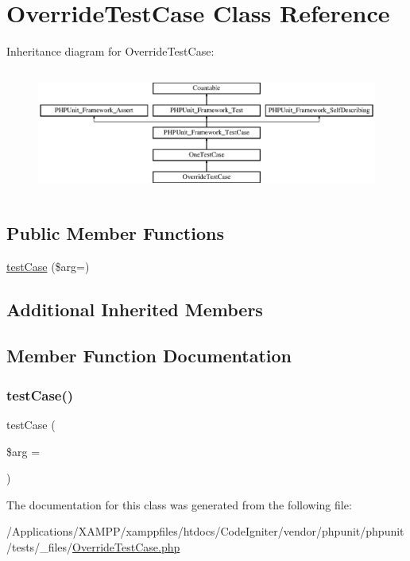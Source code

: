 \hypertarget{class_override_test_case}{}\section{Override\+Test\+Case Class Reference}
\label{class_override_test_case}
Inheritance diagram for Override\+Test\+Case\+:\begin{figure}[H]
\begin{center}
\leavevmode
\includegraphics[height=4.129793cm]{class_override_test_case}
\end{center}
\end{figure}
\subsection*{Public Member Functions}
\begin{DoxyCompactItemize}
\item 
\mbox{\hyperlink{class_override_test_case_ad285be88191f34024fb8653fe642fdc2}{test\+Case}} (\$arg=\textquotesingle{}\textquotesingle{})
\end{DoxyCompactItemize}
\subsection*{Additional Inherited Members}


\subsection{Member Function Documentation}
\mbox{\label{class_override_test_case_ad285be88191f34024fb8653fe642fdc2}} 
\subsubsection{\texorpdfstring{test\+Case()}{testCase()}}
{\footnotesize\ttfamily test\+Case (\begin{DoxyParamCaption}\item[{}]{\$arg = {\ttfamily \textquotesingle{}\textquotesingle{}} }\end{DoxyParamCaption})}



The documentation for this class was generated from the following file\+:\begin{DoxyCompactItemize}
\item 
/\+Applications/\+X\+A\+M\+P\+P/xamppfiles/htdocs/\+Code\+Igniter/vendor/phpunit/phpunit/tests/\+\_\+files/\mbox{\hyperlink{_override_test_case_8php}{Override\+Test\+Case.\+php}}\end{DoxyCompactItemize}
